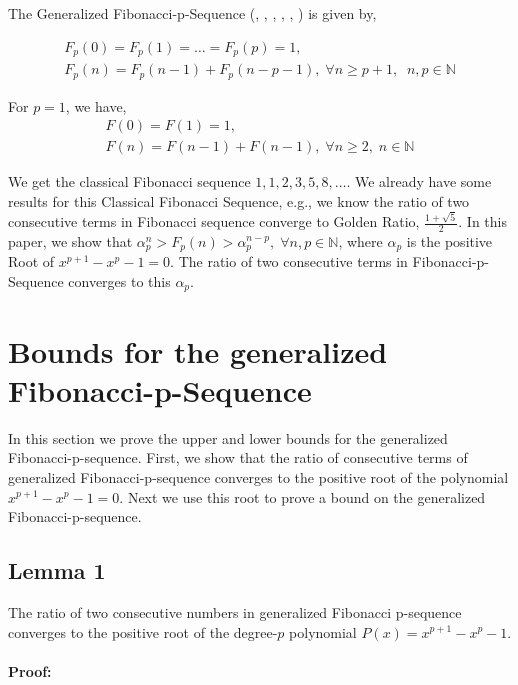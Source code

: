 \documentclass{ijcsa}
\begin{document}
\par The Generalized Fibonacci-p-Sequence (\cite{horadam61}, \cite{basin63}, \cite{hoggatt72}, \cite{atkins87}, \cite{hendel94}, \cite{sun92}) is given by, 

\begin{eqnarray}
\label{fib}
\nonumber F_{p}(0)=F_{p}(1)=\ldots=F_{p}(p)=1,\\
F_{p}(n)=F_{p}(n-1)+F_{p}(n-p-1),\;\forall{n\geq p+1},\;\;n,p\in\mathbb{N}
\end{eqnarray}

\par For $p=1$, we have,
\begin{eqnarray*}
F(0)=F(1)=1,\\
F(n)=F(n-1)+F(n-1),\;\forall{n\geq2},\;n \in \mathbb{N}
\end{eqnarray*}
\par We get the classical Fibonacci sequence $1,1,2,3,5,8,\ldots$. We already have some results for this
Classical Fibonacci Sequence, e.g., we know the ratio of two consecutive terms in Fibonacci sequence converge to Golden Ratio,  
$\frac{1+\sqrt{5}}{2}$. 
In this paper, we show that $\alpha_{p}^{n}>F_{p}(n)>\alpha_{p}^{n-p},\;\forall{n,p} \in \mathbb{N}$, where $\alpha_{p}$ is the positive Root of $x^{p+1}-x^{p}-1=0$. The ratio of two consecutive terms in Fibonacci-p-Sequence converges to this $\alpha_{p}$.

\section{Bounds for the generalized Fibonacci-p-Sequence}
In this section we prove the upper and lower bounds for the generalized Fibonacci-p-sequence. First, we show that the ratio of 
consecutive terms of generalized Fibonacci-p-sequence converges to the positive root of the polynomial $x^{p+1}-x^p-1=0$. Next 
we use this root to prove a bound on the generalized Fibonacci-p-sequence.

\subsection{Lemma 1}
\label{sec:Lemma1}
\par The ratio of two consecutive numbers in generalized Fibonacci p-sequence converges to the positive root of 
the degree-$p$ polynomial $P(x)=x^{p+1}-x^{p}-1$.

\paragraph{Proof:}
\label{sec:Proof}
\end{document}
